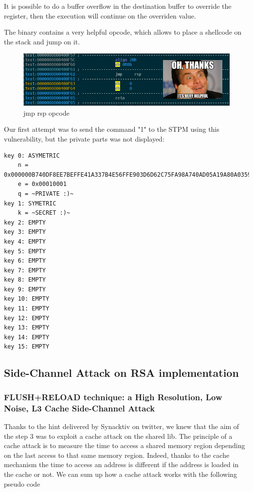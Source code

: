 \documentclass[a4paper]{article}
\begin{document}
It is possible to do a buffer overflow in the destination buffer to override the  register, then the execution will continue on the overriden value.

The  binary contains a very helpful  opcode, which allows to place a shellcode on the stack and jump on it.

\begin{figure}[H]
    \center
    \includegraphics[scale=0.7]{jmp_rsp}
    \caption{jmp rsp opcode}
\end{figure}

Our first attempt was to send the command "1" to the STPM using this vulnerability, but the private parts was not displayed:

\begin{lstlisting}[caption={Result of the command "1" sent to the STPM},numbers=none,style=colortilde]
key 0: ASYMETRIC
	n = 0x000000B740DF8EE7BEFFE41A337B4E56FFE903D6D62C75FA98A740AD05A19A80A03597[...] 
	e = 0x00010001
	q = ~PRIVATE :)~
key 1: SYMETRIC
	k = ~SECRET :)~
key 2: EMPTY
key 3: EMPTY
key 4: EMPTY
key 5: EMPTY
key 6: EMPTY
key 7: EMPTY
key 8: EMPTY
key 9: EMPTY
key 10: EMPTY
key 11: EMPTY
key 12: EMPTY
key 13: EMPTY
key 14: EMPTY
key 15: EMPTY
\end{lstlisting}


\subsection{Side-Channel Attack on RSA implementation}
\subsubsection{FLUSH+RELOAD technique: a High Resolution, Low Noise, L3 Cache Side-Channel Attack}
Thanks to the hint delivered by Synacktiv on twitter, we knew that the aim of the step 3 was to exploit a cache attack on the shared lib.\newline
The principle of a cache attack is to measure the time to access a shared memory region depending on the last access to that same memory region. Indeed, thanks to the cache mechanism the time to access an address is different if the address is loaded in the cache or not.  We can sum up how a cache attack works with the following pseudo code
\end{document}
